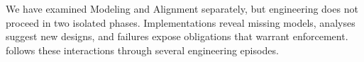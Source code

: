 
We have examined Modeling and Alignment separately, but engineering does not proceed in two isolated phases. Implementations reveal missing models, analyses suggest new designs, and failures expose obligations that warrant enforcement.  follows these interactions through several engineering episodes.
